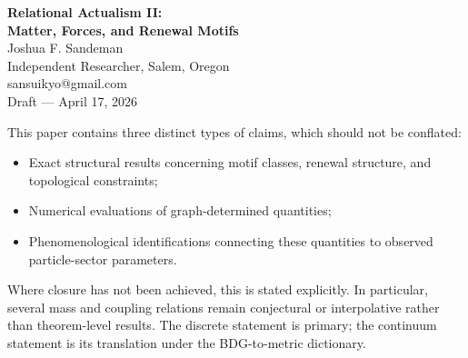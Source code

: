 \documentclass[11pt]{article}
\begin{document}
\begin{center}
{\LARGE \textbf{Relational Actualism II:\\[0.3em] Matter, Forces, and Renewal Motifs}}\\[1em]
{\large Joshua F. Sandeman}\\[0.25em]
{\normalsize Independent Researcher, Salem, Oregon}\\[0.15em]
{\small sansuikyo@gmail.com}\\[0.5em]
{\normalsize Draft --- April 17, 2026}
\end{center}

\begin{abstract}
This paper develops the matter-and-force sector of Relational Actualism (RA) by relating stable particle classes, force mediation, and coupling hierarchy to the discrete topology of the actualization graph. The central claim is structural: the physically relevant sector is organized by a small set of motif and renewal types determined by the $d=4$ Benincasa--Dowker growth law. From this architecture the paper derives a set of exact discrete constraints, presents numerical evaluations of graph-determined quantities, and proposes a number of phenomenological identifications with observed particle-sector parameters. These result types are distinguished explicitly and should not be conflated. The topology classification core is structural: five topologically distinct stability classes are shown---via Lean-verified enumeration over 124 extension cases---to correspond to the Standard Model particle types. The three non-gravitational forces are unified under a single bandwidth-limited graph-propagation principle. Several mass and coupling relations, including the proton mass cascade and CKM-angle identifications, remain conjectural or phenomenological and are labeled as such. The goal of the paper is therefore not to announce complete closure of the matter sector, but to establish a disciplined RA programme in which particle physics is constrained by discrete graph structure rather than imposed as a separate continuum input.
\end{abstract}

\begin{tcolorbox}[title=Epistemic Status of Results in This Paper,colback=gray!5,colframe=gray!60]
This paper contains three distinct types of claims, which should not be conflated:
\begin{itemize}[nosep]
    \item Exact structural results concerning motif classes, renewal structure, and topological constraints;
    \item Numerical evaluations of graph-determined quantities;
    \item Phenomenological identifications connecting these quantities to observed particle-sector parameters.
\end{itemize}
Where closure has not been achieved, this is stated explicitly. In particular, several mass and coupling relations remain conjectural or interpolative rather than theorem-level results. The discrete statement is primary; the continuum statement is its translation under the BDG-to-metric dictionary.
\end{tcolorbox}
\end{document}
